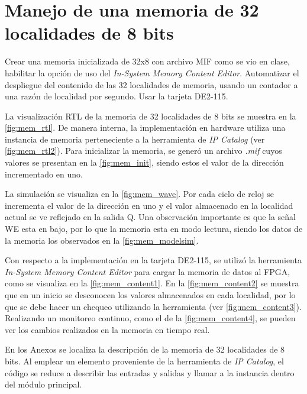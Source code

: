 \section{Manejo de una memoria de 32 localidades de 8 bits \label{sec:s1}}

\begin{center}
	\begin{minipage}{12cm}
		\begin{tcolorbox}[title=Actividad 1]
			Crear una memoria inicializada de 32x8 con archivo MIF como se vio en clase, habilitar la opción de uso del \textit{In-System Memory Content Editor}. Automatizar el despliegue del contenido de las 32 localidades de memoria, usando un contador a una razón de localidad por segundo. Usar la tarjeta DE2-115.
		\end{tcolorbox}	
	\end{minipage}
\end{center}

La visualización RTL de la memoria de 32 localidades de 8 bits se muestra en la \autoref{fig:mem_rtl}. De manera interna, la implementación en hardware utiliza una instancia de memoria perteneciente a la herramienta de \textit{IP Catalog} (ver \autoref{fig:mem_rtl2}). Para inicializar la memoria, se generó un archivo \textit{.mif} cuyos valores se presentan en la \autoref{fig:mem_init}, siendo estos el valor de la dirección incrementado en uno. 

La simulación se visualiza en la \autoref{fig:mem_wave}. Por cada ciclo de reloj se incrementa el valor de la dirección en uno y el valor almacenado en la localidad actual se ve reflejado en la salida Q. Una observación importante es que la señal WE esta en bajo, por lo que la memoria esta en modo lectura, siendo los datos de la memoria los observados en la \autoref{fig:mem_modelsim}. 

Con respecto a la implementación en la tarjeta DE2-115, se utilizó la herramienta \textit{In-System Memory Content Editor} para cargar la memoria de datos al FPGA, como se visualiza en la \autoref{fig:mem_content1}. En la \autoref{fig:mem_content2} se muestra que en un inicio se desconocen los valores almacenados en cada localidad, por lo que se debe hacer un chequeo utilizando la herramienta (ver \autoref{fig:mem_content3}). Realizando un monitoreo continuo, como el de la \autoref{fig:mem_content4}, se pueden ver los cambios realizados en la memoria en tiempo real.

En los Anexos se localiza la descripción de la memoria de 32 localidades de 8 bits. Al emplear un elemento proveniente de la herramienta de \textit{IP Catalog}, el código se reduce a describir las entradas y salidas y llamar a la instancia dentro del módulo principal.

